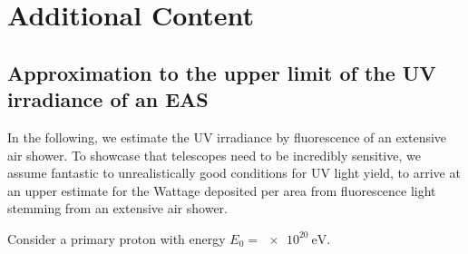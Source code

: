 
\chapter{Additional Content}
\label{app:other}

\section{Approximation to the upper limit of the UV irradiance of an EAS}
\label{app:cr-uv-irradiance}

In the following, we estimate the UV irradiance by fluorescence of an extensive 
air shower. To showcase that telescopes need to be incredibly sensitive, we 
assume fantastic to unrealistically good conditions for UV light yield, to 
arrive at an upper estimate for the Wattage deposited per area from fluorescence
light stemming from an extensive air shower.

Consider a primary proton with energy $E_0 = \SI{e20}{\eV}$. 
